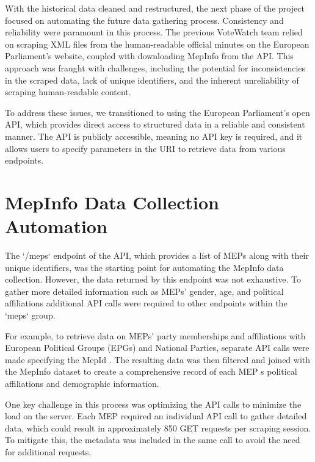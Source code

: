\documentclass[a4paper,12pt]{report}
\begin{document}
            With the historical data cleaned and restructured, the next phase of the project focused on automating the
            future
            data gathering process. Consistency and reliability were paramount in this process. The previous VoteWatch
            team
            relied on scraping XML files from the human-readable official minutes on the European Parliament's website,
            coupled
            with downloading MepInfo from the API. This approach was fraught with challenges, including the potential
            for
            inconsistencies in the scraped data, lack of unique identifiers, and the inherent unreliability of scraping
            human-readable content.

            To address these issues, we transitioned to using the European Parliament's open API, which provides direct
            access
            to structured data in a reliable and consistent manner. The API is publicly accessible, meaning no API key
            is
            required, and it allows users to specify parameters in the URI to retrieve data from various endpoints.


        \section{MepInfo Data Collection Automation}\label{sec:mepinfo-data-collection-automation}
            The `/meps` endpoint of the API, which provides a list of MEPs along with their unique identifiers, was the
            starting
            point for automating the MepInfo data collection. However, the data returned by this endpoint was not
            exhaustive. To
            gather more detailed information such as MEPs' gender, age, and political affiliations additional API calls
            were
            required to other endpoints within the `meps` group.

            For example, to retrieve data on MEPs' party memberships and affiliations with European Political Groups
            (EPGs) and
            National Parties, separate API calls were made specifying the MepId . The resulting data was then filtered
            and joined
            with the MepInfo dataset to create a comprehensive record of each MEP s political affiliations and
            demographic
            information.

            One key challenge in this process was optimizing the API calls to minimize the load on the server. Each MEP
            required
            an individual API call to gather detailed data, which could result in approximately 850 GET requests per
            scraping
            session. To mitigate this, the metadata was included in the same call to avoid the need for additional
            requests.
\end{document}
